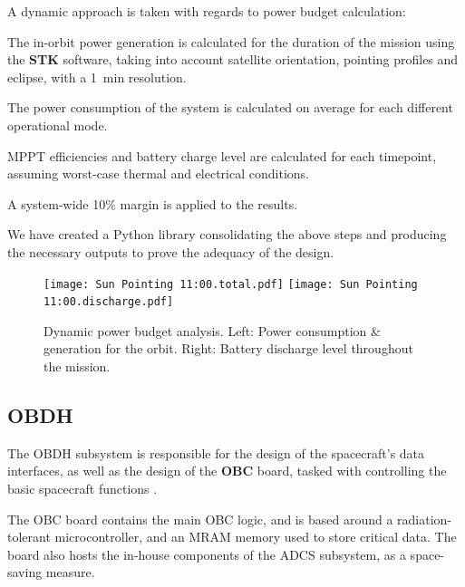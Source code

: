 \documentclass[a4paper,nobib]{tufte-book}
\begin{document}
\FloatBarrier
A dynamic approach is taken with regards to power budget calculation:
\begin{compactenum}
	\item The in-orbit power generation is calculated for the duration of the mission using the \textbf{STK} software, taking into account satellite orientation, pointing profiles and eclipse, with a \SI{1}{\minute} resolution.
	\item The power consumption of the system is calculated on average for each different operational mode.
	\item \acs{MPPT} efficiencies and battery charge level are calculated for each timepoint, assuming worst-case thermal and electrical conditions.
	\item A system-wide 10\% margin is applied to the results.
\end{compactenum}

We have created a Python library consolidating the above steps and producing the necessary outputs to prove the adequacy of the design.

\begin{figure}[h]
	\texttt{[image: Sun Pointing 11:00.total.pdf]}
	\hfill
	\texttt{[image: Sun Pointing 11:00.discharge.pdf]}

	\caption[Dynamic power budget analysis]{Dynamic power budget analysis. Left: Power consumption \& generation for the orbit. Right: Battery discharge level throughout the mission.}
\end{figure}

\subsection{\acf{OBDH}}
\label{sec:obdh}

The \ac{OBDH} subsystem is responsible for the design of the spacecraft's data interfaces, as well as the design of the \textbf{\acf{OBC}} board, tasked with controlling the basic spacecraft functions \autocite{DDJF_OBDH}.

The \ac{OBC} board contains the main \ac{OBC} logic, and is based around a  radiation-tolerant microcontroller, and an \acs{MRAM} memory used to store critical data. The board also hosts the in-house components of the \ac{ADCS} subsystem, as a space-saving measure.
\end{document}
